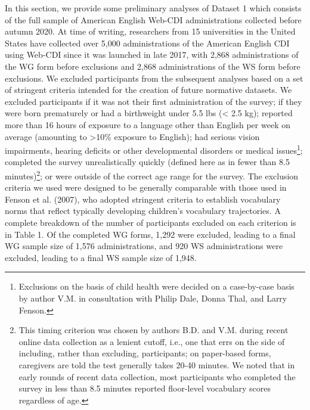 \documentclass[
  english,
  ,man,floatsintext]{apa6}
\begin{document}
In this section, we provide some preliminary analyses of Dataset 1 which consists of the full sample of American English Web-CDI administrations collected before autumn 2020. At time of writing, researchers from 15 universities in the United States have collected over 5,000 administrations of the American English CDI using Web-CDI since it was launched in late 2017, with 2,868 administrations of the WG form before exclusions and 2,868 administrations of the WS form before exclusions. We excluded participants from the subsequent analyses based on a set of stringent criteria intended for the creation of future normative datasets. We excluded participants if it was not their first administration of the survey; if they were born prematurely or had a birthweight under 5.5 lbs (\textless{} 2.5 kg); reported more than 16 hours of exposure to a language other than English per week on average (amounting to \textgreater10\% exposure to English); had serious vision impairments, hearing deficits or other developmental disorders or medical issues\footnote{Exclusions on the basis of child health were decided on a case-by-case basis by author V.M. in consultation with Philip Dale, Donna Thal, and Larry Fenson.}; completed the survey unrealistically quickly (defined here as in fewer than 8.5 minutes)\footnote{This timing criterion was chosen by authors B.D. and V.M. during recent online data collection as a lenient cutoff, i.e., one that errs on the side of including, rather than excluding, participants; on paper-based forms, caregivers are told the test generally takes 20-40 minutes. We noted that in early rounds of recent data collection, most participants who completed the survey in less than 8.5 minutes reported floor-level vocabulary scores regardless of age.}; or were outside of the correct age range for the survey. The exclusion criteria we used were designed to be generally comparable with those used in Fenson et al. (2007), who adopted stringent criteria to establish vocabulary norms that reflect typically developing children's vocabulary trajectories. A complete breakdown of the number of participants excluded on each criterion is in Table 1. Of the completed WG forms, 1,292 were excluded, leading to a final WG sample size of 1,576 administrations, and 920 WS administrations were excluded, leading to a final WS sample size of 1,948.
\end{document}
